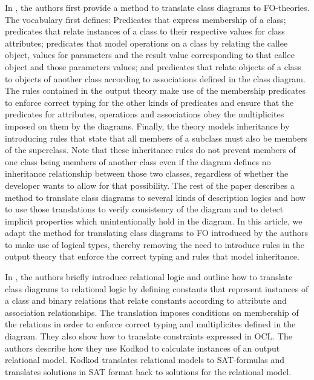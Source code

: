 \documentclass[conference]{IEEEtran}
\begin{document}
In \cite{BerardiDaniela2005RoUc}, the authors first provide a method to translate class diagrams to FO-theories. The vocabulary first defines: Predicates that express membership of a class; predicates that relate instances of a class to their respective values for class attributes; predicates that model operations on a class by relating the callee object, values for parameters and the result value corresponding to that callee object and those parameters values; and predicates that relate objects of a class to objects of another class according to associations defined in the class diagram. The rules contained in the output theory make use of the membership predicates to enforce correct typing for the other kinds of predicates and ensure that the predicates for attributes, operations and associations obey the multiplicites imposed on them by the diagrams. Finally, the theory models inheritance by introducing rules that state that all members of a subclass must also be members of the superclass. Note that these inheritance rules do not prevent members of one class being members of another class even if the diagram defines no inheritance relationship between those two classes, regardless of whether the developer wants to allow for that possibility. The rest of the paper describes a method to translate class diagrams to several kinds of description logics and how to use those translations to verify consistency of the diagram and to detect implicit properties which unintentionally hold in the diagram. In this article, we adapt the method for translating class diagrams to FO introduced by the authors to make use of logical types, thereby removing the need to introduce rules in the output theory that enforce the correct typing and rules that model inheritance.

In \cite{KuhlmannMirco2012FUaO}, the authors briefly introduce relational logic and outline how to translate class diagrams to relational logic by defining constants that represent instances of a class and binary relations that relate constants according to attribute and association relationships. The translation imposes conditions on membership of the relations in order to enforce correct typing and multiplicites defined in the diagram. They also show how to translate constraints expressed in OCL\cite{WarmerJosB1999Ocl:}. The authors describe how they use Kodkod\cite{10.1007/978-3-540-71209-1_49} to calculate instances of an output relational model. Kodkod translates relational models to SAT-formulas and translates solutions in SAT format back to solutions for the relational model.
\end{document}

